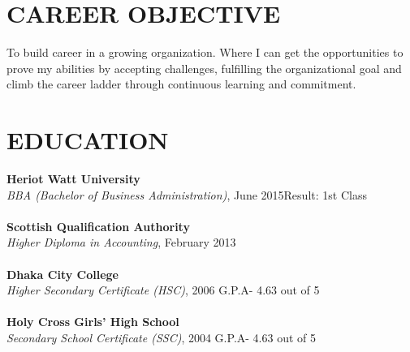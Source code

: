 \documentclass[margin]{res}
\begin{document}
\begin{resume}
%
\section{CAREER OBJECTIVE}
\par
To build career in a growing organization. Where I can get the opportunities to prove my abilities by accepting challenges, fulfilling the organizational goal and climb the career ladder through continuous learning and commitment.




\section{EDUCATION}
\textbf{Heriot Watt University}\\
{\sl BBA (Bachelor of Business Administration)}, June 2015\hfill Result: 
1st Class
\\ \\
\textbf{ Scottish Qualification Authority}\\
{\sl Higher Diploma in Accounting}, February 2013 
\\ \\
\textbf{Dhaka City College}\\
{\sl Higher Secondary Certificate (HSC)}, 2006 \hfill G.P.A- 4.63 out of 5
\\ \\
\textbf{Holy Cross Girls' High School}\\
{\sl Secondary School Certificate (SSC)}, 2004 \hfill G.P.A- 4.63 out of 5




\end{resume}
\end{document}
